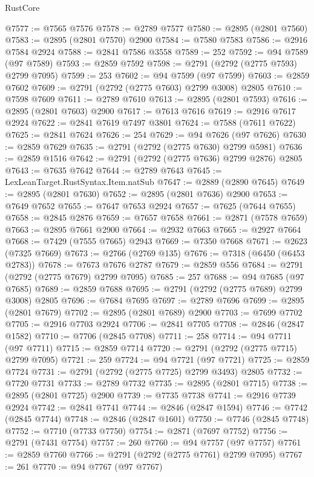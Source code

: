 \begin{lexlean}{RustCore}
\begin{coremodule}
@7577 := @7565 @7576
@7578 := @2789 @7577
@7580 := @2895 (@2801 @7560)
@7583 := @2895 (@2801 @7570) @2900
@7584 := @7580 @7583
@7586 := @2916 @7584 @2924
@7588 := @2841 @7586 @3558
@7589 := 252
@7592 := @94 @7589 (@97 @7589)
@7593 := @2859 @7592
@7598 := @2791 (@2792 (@2775 @7593) @2799 @7095)
@7599 := 253
@7602 := @94 @7599 (@97 @7599)
@7603 := @2859 @7602
@7609 := @2791 (@2792 (@2775 @7603) @2799 @3008) @2805
@7610 := @7598 @7609
@7611 := @2789 @7610
@7613 := @2895 (@2801 @7593)
@7616 := @2895 (@2801 @7603) @2900
@7617 := @7613 @7616
@7619 := @2916 @7617 @2924
@7622 := @2841 @7619 @7497 @3801
@7624 := @7588 (@7611 @7622)
@7625 := @2841 @7624
@7626 := 254
@7629 := @94 @7626 (@97 @7626)
@7630 := @2859 @7629
@7635 := @2791 (@2792 (@2775 @7630) @2799 @5981)
@7636 := @2859 @1516
@7642 := @2791 (@2792 (@2775 @7636) @2799 @2876) @2805
@7643 := @7635 @7642
@7644 := @2789 @7643
@7645 := LexLeanTarget.RustSyntax.Item.natSub
@7647 := @2889 (@2890 @7645)
@7649 := @2895 (@2801 @7630)
@7652 := @2895 (@2801 @7636) @2900
@7653 := @7649 @7652
@7655 := @7647 @7653 @2924
@7657 := @7625 (@7644 @7655)
@7658 := @2845 @2876
@7659 := @7657 @7658
@7661 := @2871 (@7578 @7659)
@7663 := @2895 @7661 @2900
@7664 := @2932 @7663
@7665 := @2927 @7664
@7668 := @7429 (@7555 @7665) @2943
@7669 := @7350 @7668
@7671 := @2623 (@7325 @7669)
@7673 := @2766 (@2769 @135)
@7676 := @7318 (@6450 (@6453 @2783))
@7678 := @7673 @7676 @2787
@7679 := @2859 @556
@7684 := @2791 (@2792 (@2775 @7679) @2799 @7095)
@7685 := 257
@7688 := @94 @7685 (@97 @7685)
@7689 := @2859 @7688
@7695 := @2791 (@2792 (@2775 @7689) @2799 @3008) @2805
@7696 := @7684 @7695
@7697 := @2789 @7696
@7699 := @2895 (@2801 @7679)
@7702 := @2895 (@2801 @7689) @2900
@7703 := @7699 @7702
@7705 := @2916 @7703 @2924
@7706 := @2841 @7705
@7708 := @2846 (@2847 @1582)
@7710 := @7706 (@2845 @7708)
@7711 := 258
@7714 := @94 @7711 (@97 @7711)
@7715 := @2859 @7714
@7720 := @2791 (@2792 (@2775 @7715) @2799 @7095)
@7721 := 259
@7724 := @94 @7721 (@97 @7721)
@7725 := @2859 @7724
@7731 := @2791 (@2792 (@2775 @7725) @2799 @3493) @2805
@7732 := @7720 @7731
@7733 := @2789 @7732
@7735 := @2895 (@2801 @7715)
@7738 := @2895 (@2801 @7725) @2900
@7739 := @7735 @7738
@7741 := @2916 @7739 @2924
@7742 := @2841 @7741
@7744 := @2846 (@2847 @1594)
@7746 := @7742 (@2845 @7744)
@7748 := @2846 (@2847 @1601)
@7750 := @7746 (@2845 @7748)
@7752 := @7710 (@7733 @7750)
@7754 := @2871 (@7697 @7752)
@7756 := @2791 (@7431 @7754)
@7757 := 260
@7760 := @94 @7757 (@97 @7757)
@7761 := @2859 @7760
@7766 := @2791 (@2792 (@2775 @7761) @2799 @7095)
@7767 := 261
@7770 := @94 @7767 (@97 @7767)

\end{coremodule}
\end{lexlean}
